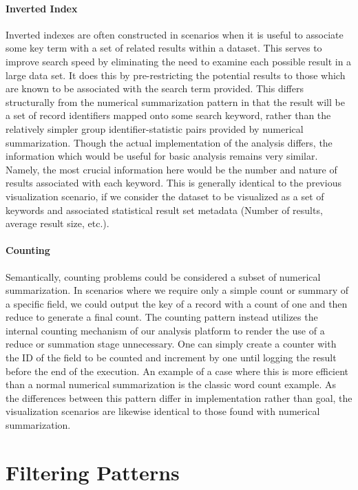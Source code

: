 \paragraph{Inverted Index}
Inverted indexes are often constructed in scenarios when it is useful to associate some key term with a set of related results within a dataset. This serves to improve search speed by eliminating the need to examine each possible result in a large data set. It does this by pre-restricting the potential results to those which are known to be associated with the search term provided. This differs structurally from the numerical summarization pattern in that the result will be a set of record identifiers mapped onto some search keyword, rather than the relatively simpler group identifier-statistic pairs provided by numerical summarization. Though the actual implementation of the analysis differs, the information which would be useful for basic analysis remains very similar. Namely, the most crucial information here would be the number and nature of results associated with each keyword. This is generally identical to the previous visualization scenario, if we consider the dataset to be visualized as a set of keywords and associated statistical result set metadata (Number of results, average result size, etc.).  

\paragraph{Counting}
Semantically, counting problems could be considered a subset of numerical summarization. In scenarios where we require only a simple count or summary of a specific field, we could output the key of a record with a count of one and then reduce to generate a final count. The counting pattern instead utilizes the internal counting mechanism of our analysis platform to render the use of a reduce or summation stage unnecessary. One can simply create a counter with the ID of the field to be counted and increment by one until logging the result before the end of the execution. An example of a case where this is more efficient than a normal numerical summarization is the classic word count example. As the differences between this pattern differ in implementation rather than goal, the visualization scenarios are likewise identical to those found with numerical summarization. 

\section{Filtering Patterns}
\label{sec:filtering}

